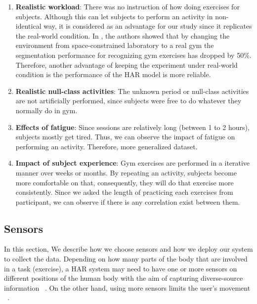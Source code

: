 \documentclass[journal,article,submit,moreauthors,pdftex]{Definitions/mdpi}
\begin{document}
\begin{enumerate}
	
	\item \textbf{Realistic workload}: There was no instruction of how doing exercises for subjects. Although this can let subjects to perform an activity in non-identical way, it is considered as an advantage for our study since it replicates the real-world condition. In \cite{morris2014recofit}, the authors showed that by changing the environment from space-constrained laboratory to a real gym the segmentation performance for recognizing gym exercises has dropped by 50\%. Therefore, another advantage of keeping the experiment under real-world condition is the performance of the HAR model is more reliable.	
	\item \textbf{Realistic null-class activities}:	The unknown period or null-class activities are not artificially performed, since subjects were free to do whatever they normally do in gym.	
	\item \textbf{Effects of fatigue}: Since sessions are relatively long (between 1 to 2 hours), subjects mostly get tired. Thus, we can observe the impact of fatigue on performing an activity. Therefore, more generalized dataset.
	
	\item \textbf{Impact of subject experience}: Gym exercises are performed in a iterative manner over weeks or months. By repeating an activity, subjects become more comfortable on that, consequently, they will do that exercise more consistently. Since we asked the length of practicing each exercises from participant, we can observe if there is any correlation exist between them.
\end{enumerate}

\subsection{Sensors} 

In this section, We describe how we choose sensors and how we deploy our system to collect the data. Depending on how many parts of the body that are involved in a task (exercise), a HAR system may need to have one or more sensors on different positions of the human body with the aim of capturing diverse-source information ~\cite{wang2019survey}. On the other hand, using more sensors limits the user's movement ~\cite{de2018comparative}. 
\end{document}
